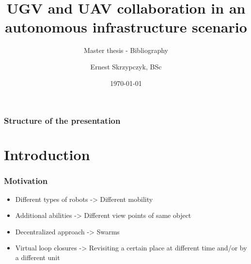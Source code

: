 \documentclass{beamerthesis}
\author{Ernest Skrzypczyk, BSc}
\title[UGV \& UAV collaboration]{UGV and UAV collaboration in an autonomous infrastructure scenario}
\subtitle{Master thesis - Bibliography}
\institute{EMARO+} %
\date{\today}
\begin{document}
\begin{frame}[plain] %
	\titlepage
\end{frame}

\setcounter{framenumber}{0}



\begin{frame}
	\frametitle{Structure of the presentation}
	\tableofcontents
\end{frame}


\section{Introduction}
\begin{frame}\frametitle{Motivation}
	\begin{itemize}
		\item Different types of robots -> Different mobility
		\item Additional abilities -> Different view points of same object
		\item Decentralized approach -> Swarms
		\item Virtual loop closures -> Revisiting a certain place at different time and/or by a different unit
	\end{itemize}
\end{frame}
\end{document}
